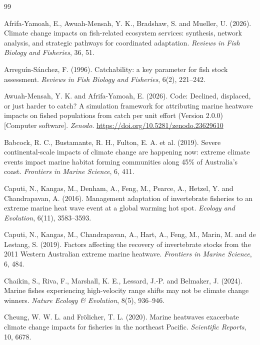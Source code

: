 \begin{thebibliography}{99}
\setlength{\itemsep}{2pt}

Afrifa-Yamoah, E., Awuah-Mensah, Y. K., Bradshaw, S. and Mueller, U. (2026). Climate change impacts on fish-related ecosystem services: synthesis, network analysis, and strategic pathways for coordinated adaptation. \textit{Reviews in Fish Biology and Fisheries}, 36, 51.

Arregu\'in-S\'anchez, F. (1996). Catchability: a key parameter for fish stock assessment. \textit{Reviews in Fish Biology and Fisheries}, 6(2), 221--242.

Awuah-Mensah, Y. K. and Afrifa-Yamoah, E. (2026). Code: Declined, displaced, or just harder to catch? A simulation framework for attributing marine heatwave impacts on fished populations from catch per unit effort (Version 2.0.0) [Computer software]. \textit{Zenodo}. \url{https://doi.org/10.5281/zenodo.23629610}

Babcock, R. C., Bustamante, R. H., Fulton, E. A. et al. (2019). Severe continental-scale impacts of climate change are happening now: extreme climate events impact marine habitat forming communities along 45\% of Australia's coast. \textit{Frontiers in Marine Science}, 6, 411.

Caputi, N., Kangas, M., Denham, A., Feng, M., Pearce, A., Hetzel, Y. and Chandrapavan, A. (2016). Management adaptation of invertebrate fisheries to an extreme marine heat wave event at a global warming hot spot. \textit{Ecology and Evolution}, 6(11), 3583--3593.

Caputi, N., Kangas, M., Chandrapavan, A., Hart, A., Feng, M., Marin, M. and de Lestang, S. (2019). Factors affecting the recovery of invertebrate stocks from the 2011 Western Australian extreme marine heatwave. \textit{Frontiers in Marine Science}, 6, 484.

Chaikin, S., Riva, F., Marshall, K. E., Lessard, J.-P. and Belmaker, J. (2024). Marine fishes experiencing high-velocity range shifts may not be climate change winners. \textit{Nature Ecology \& Evolution}, 8(5), 936--946.

Cheung, W. W. L. and Fr\"olicher, T. L. (2020). Marine heatwaves exacerbate climate change impacts for fisheries in the northeast Pacific. \textit{Scientific Reports}, 10, 6678.


\end{thebibliography}
